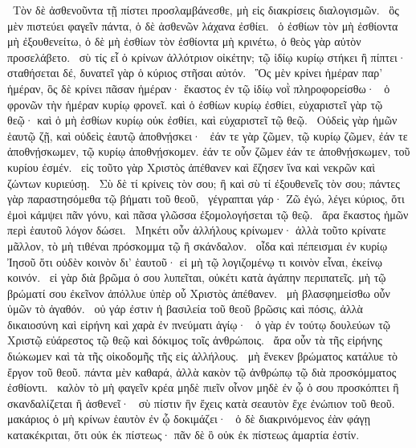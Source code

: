 ~Τὸν δὲ ἀσθενοῦντα τῇ πίστει προσλαμβάνεσθε, μὴ εἰς διακρίσεις διαλογισμῶν.
~ὃς μὲν πιστεύει φαγεῖν πάντα, ὁ δὲ ἀσθενῶν λάχανα ἐσθίει.
~ὁ ἐσθίων τὸν μὴ ἐσθίοντα μὴ ἐξουθενείτω, ὁ δὲ μὴ ἐσθίων τὸν ἐσθίοντα μὴ κρινέτω, ὁ θεὸς γὰρ αὐτὸν προσελάβετο.
~σὺ τίς εἶ ὁ κρίνων ἀλλότριον οἰκέτην; τῷ ἰδίῳ κυρίῳ στήκει ἢ πίπτει· σταθήσεται δέ, δυνατεῖ γὰρ ὁ κύριος στῆσαι αὐτόν.
~Ὃς μὲν κρίνει ἡμέραν παρ’ ἡμέραν, ὃς δὲ κρίνει πᾶσαν ἡμέραν· ἕκαστος ἐν τῷ ἰδίῳ νοῒ πληροφορείσθω·
~ὁ φρονῶν τὴν ἡμέραν κυρίῳ φρονεῖ. καὶ ὁ ἐσθίων κυρίῳ ἐσθίει, εὐχαριστεῖ γὰρ τῷ θεῷ· καὶ ὁ μὴ ἐσθίων κυρίῳ οὐκ ἐσθίει, καὶ εὐχαριστεῖ τῷ θεῷ.
~Οὐδεὶς γὰρ ἡμῶν ἑαυτῷ ζῇ, καὶ οὐδεὶς ἑαυτῷ ἀποθνῄσκει·
~ἐάν τε γὰρ ζῶμεν, τῷ κυρίῳ ζῶμεν, ἐάν τε ἀποθνῄσκωμεν, τῷ κυρίῳ ἀποθνῄσκομεν. ἐάν τε οὖν ζῶμεν ἐάν τε ἀποθνῄσκωμεν, τοῦ κυρίου ἐσμέν.
~εἰς τοῦτο γὰρ Χριστὸς ἀπέθανεν καὶ ἔζησεν ἵνα καὶ νεκρῶν καὶ ζώντων κυριεύσῃ.
~Σὺ δὲ τί κρίνεις τὸν  σου; ἢ καὶ σὺ τί ἐξουθενεῖς τὸν  σου; πάντες γὰρ παραστησόμεθα τῷ βήματι τοῦ θεοῦ,
~γέγραπται γάρ· Ζῶ ἐγώ, λέγει κύριος, ὅτι ἐμοὶ κάμψει πᾶν γόνυ, καὶ πᾶσα γλῶσσα ἐξομολογήσεται τῷ θεῷ.
~ἄρα ἕκαστος ἡμῶν περὶ ἑαυτοῦ λόγον δώσει.
~Μηκέτι οὖν ἀλλήλους κρίνωμεν· ἀλλὰ τοῦτο κρίνατε μᾶλλον, τὸ μὴ τιθέναι πρόσκομμα τῷ  ἢ σκάνδαλον.
~οἶδα καὶ πέπεισμαι ἐν κυρίῳ Ἰησοῦ ὅτι οὐδὲν κοινὸν δι’ ἑαυτοῦ· εἰ μὴ τῷ λογιζομένῳ τι κοινὸν εἶναι, ἐκείνῳ κοινόν.
~εἰ γὰρ διὰ βρῶμα ὁ  σου λυπεῖται, οὐκέτι κατὰ ἀγάπην περιπατεῖς. μὴ τῷ βρώματί σου ἐκεῖνον ἀπόλλυε ὑπὲρ οὗ Χριστὸς ἀπέθανεν.
~μὴ βλασφημείσθω οὖν ὑμῶν τὸ ἀγαθόν.
~οὐ γάρ ἐστιν ἡ βασιλεία τοῦ θεοῦ βρῶσις καὶ πόσις, ἀλλὰ δικαιοσύνη καὶ εἰρήνη καὶ χαρὰ ἐν πνεύματι ἁγίῳ·
~ὁ γὰρ ἐν τούτῳ δουλεύων τῷ Χριστῷ εὐάρεστος τῷ θεῷ καὶ δόκιμος τοῖς ἀνθρώποις.
~ἄρα οὖν τὰ τῆς εἰρήνης διώκωμεν καὶ τὰ τῆς οἰκοδομῆς τῆς εἰς ἀλλήλους.
~μὴ ἕνεκεν βρώματος κατάλυε τὸ ἔργον τοῦ θεοῦ. πάντα μὲν καθαρά, ἀλλὰ κακὸν τῷ ἀνθρώπῳ τῷ διὰ προσκόμματος ἐσθίοντι.
~καλὸν τὸ μὴ φαγεῖν κρέα μηδὲ πιεῖν οἶνον μηδὲ ἐν ᾧ ὁ  σου προσκόπτει ἢ σκανδαλίζεται ἢ ἀσθενεῖ·
~σὺ πίστιν ἣν ἔχεις κατὰ σεαυτὸν ἔχε ἐνώπιον τοῦ θεοῦ. μακάριος ὁ μὴ κρίνων ἑαυτὸν ἐν ᾧ δοκιμάζει·
~ὁ δὲ διακρινόμενος ἐὰν φάγῃ κατακέκριται, ὅτι οὐκ ἐκ πίστεως· πᾶν δὲ ὃ οὐκ ἐκ πίστεως ἁμαρτία ἐστίν.

